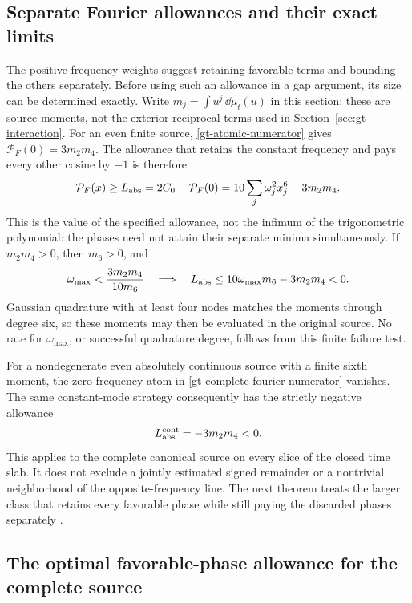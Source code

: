 \subsection{Separate Fourier allowances and their exact limits}

The positive frequency weights suggest retaining favorable terms and
bounding the others separately. Before using such an allowance in a gap
argument, its size can be determined exactly. Write
\(m_j=\int u^j\,\dd\mu_t(u)\) in this section; these are source moments,
not the exterior reciprocal terms used in Section~\ref{sec:gt-interaction}.
For an even finite source, \eqref{gt-atomic-numerator} gives
\(\mathcal P_F(0)=3m_2m_4\). The allowance that retains the constant
frequency and pays every other cosine by \(-1\) is therefore
\begin{equation}
 \mathcal P_F(x)\ge L_{\rm abs}
 =2C_0-\mathcal P_F(0)
 =10\sum_j\omega_j^2x_j^6-3m_2m_4 .
 \label{gt-absolute-fourier-allowance}
\end{equation}
This is the value of the specified allowance, not the infimum of the
trigonometric polynomial: the phases need not attain their separate
minima simultaneously. If \(m_2m_4>0\), then \(m_6>0\), and
\[
 \omega_{\max}<\frac{3m_2m_4}{10m_6}
 \quad\Longrightarrow\quad
 L_{\rm abs}\le10\omega_{\max}m_6-3m_2m_4<0.
\]
Gaussian quadrature with at least four nodes matches the moments through
degree six, so these moments may then be evaluated in the original source.
No rate for \(\omega_{\max}\), or successful quadrature degree, follows
from this finite failure test.

For a nondegenerate even absolutely continuous source with a finite sixth
moment, the zero-frequency atom in
\eqref{gt-complete-fourier-numerator} vanishes. The same constant-mode
strategy consequently has the strictly negative allowance
\begin{equation}
 L_{\rm abs}^{\rm cont}=-3m_2m_4<0.
 \label{gt-continuous-absolute-allowance}
\end{equation}
This applies to the complete canonical source on every slice of the
closed time slab. It does not exclude a jointly estimated signed
remainder or a nontrivial neighborhood of the opposite-frequency line.
The next theorem treats the larger class that retains every favorable
phase while still paying the discarded phases separately \cite{gtphase}.

\subsection{The optimal favorable-phase allowance for the complete source}

